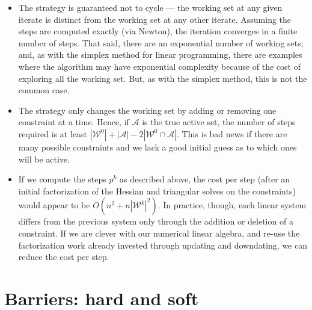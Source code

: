 \documentclass[12pt, leqno]{article} %
\providecommand{\tightlist}{%
  \setlength{\itemsep}{0pt}\setlength{\parskip}{0pt}}
\begin{document}
\begin{itemize}
\tightlist
\item
  The strategy is guaranteed not to cycle --- the working set at any
  given iterate is distinct from the working set at any other iterate.
  Assuming the steps are computed exactly (via Newton), the iteration
  converges in a finite number of steps. That said, there are an
  exponential number of working sets; and, as with the simplex method
  for linear programming, there are examples where the algorithm may
  have exponential complexity because of the cost of exploring all the
  working set. But, as with the simplex method, this is not the common
  case.
\item
  The strategy only changes the working set by adding or removing one
  constraint at a time. Hence, if \(\mathcal{A}\) is the true active
  set, the number of steps required is at least
  \(|\mathcal{W}^0| + |\mathcal{A}| - 2|\mathcal{W}^0 \cap \mathcal{A}|\).
  This is bad news if there are many possible constraints and we lack a
  good initial guess as to which ones will be active.
\item
  If we compute the steps \(p^k\) as described above, the cost per step
  (after an initial factorization of the Hessian and triangular solves
  on the constraints) would appear to be \(O(n^2+n|\mathcal{W}^k|^2)\).
  In practice, though, each linear system differs from the previous
  system only through the addition or deletion of a constraint. If we
  are clever with our numerical linear algebra, and re-use the
  factorization work already invested through updating and downdating,
  we can reduce the cost per step.
\end{itemize}

\section{Barriers: hard and soft}
\end{document}
